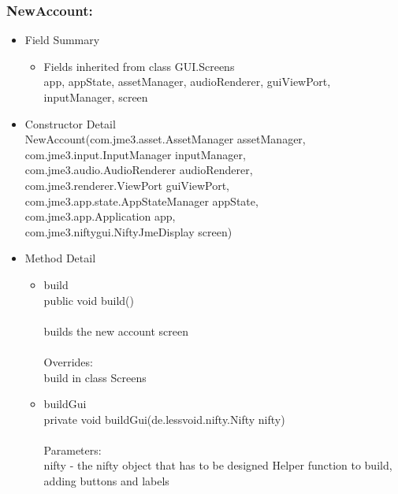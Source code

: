 \documentclass[letterpaper]{article}
\begin{document}
				\subsubsection*{NewAccount:}
				\vspace{0.1in}	
					\begin{itemize}
						\item	Field Summary
								\begin{itemize}
									\item	Fields inherited from class GUI.Screens \\
											app, appState, assetManager, audioRenderer, guiViewPort, inputManager, screen
								\end{itemize}
						\item	Constructor Detail \\
								NewAccount(com.jme3.asset.AssetManager assetManager, \\
         com.jme3.input.InputManager inputManager, \\
         com.jme3.audio.AudioRenderer audioRenderer, \\
         com.jme3.renderer.ViewPort guiViewPort, \\
         com.jme3.app.state.AppStateManager appState, \\
         com.jme3.app.Application app, \\
         com.jme3.niftygui.NiftyJmeDisplay screen)
						\item	Method Detail
								\begin{itemize}
									\item	build \\
											public void build() \\ \\
											builds the new account screen \\ \\
											Overrides: \\
											build in class Screens
									\item	buildGui \\
											private void buildGui(de.lessvoid.nifty.Nifty nifty) \\ \\
											Parameters: \\
											nifty - the nifty object that has to be designed Helper function to build, adding buttons and labels
								\end{itemize}
					\end{itemize}
					
\end{document}
